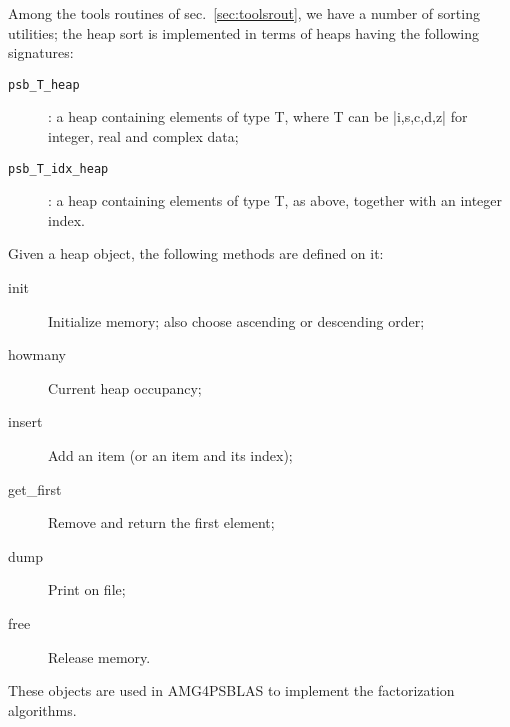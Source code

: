 Among the tools routines of sec.~\ref{sec:toolsrout}, we have a number
of sorting utilities; the heap sort is implemented in terms of heaps
having the following signatures:
\begin{description}
\item[\tt psb\_T\_heap]: a heap containing elements of type T, where T
  can be \fortinline|i,s,c,d,z| for integer, real and complex data;
\item[\tt psb\_T\_idx\_heap]: a heap containing elements of type T, as
  above, together with an integer index.
\end{description}
Given a heap object, the following methods are defined on it:
\begin{description}
\item[init] Initialize memory; also choose ascending or descending
  order;
\item[howmany] Current heap occupancy;
\item[insert] Add an item (or an item and its index);
\item[get\_first] Remove and return the first element;
\item[dump] Print on file;
\item[free] Release memory.
\end{description}
These objects are used in AMG4PSBLAS to implement the factorization
algorithms. 

